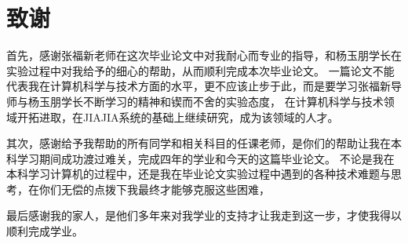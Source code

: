 \chapter[致谢]{致\quad 谢}%

首先，感谢张福新老师在这次毕业论文中对我耐心而专业的指导，和杨玉朋学长在实验过程中对我给予的细心的帮助，从而顺利完成本次毕业论文。
一篇论文不能代表我在计算机科学与技术方面的水平，更不应该止步于此，而是要学习张福新导师与杨玉朋学长不断学习的精神和锲而不舍的实验态度，
在计算机科学与技术领域开拓进取，在JIAJIA系统的基础上继续研究，成为该领域的人才。

其次，感谢给予我帮助的所有同学和相关科目的任课老师，是你们的帮助让我在本科学习期间成功渡过难关，完成四年的学业和今天的这篇毕业论文。
不论是我在本科学习计算机的过程中，还是我在毕业论文实验过程中遇到的各种技术难题与思考，在你们无偿的点拨下我最终才能够克服这些困难，

最后感谢我的家人，是他们多年来对我学业的支持才让我走到这一步，才使我得以顺利完成学业。








